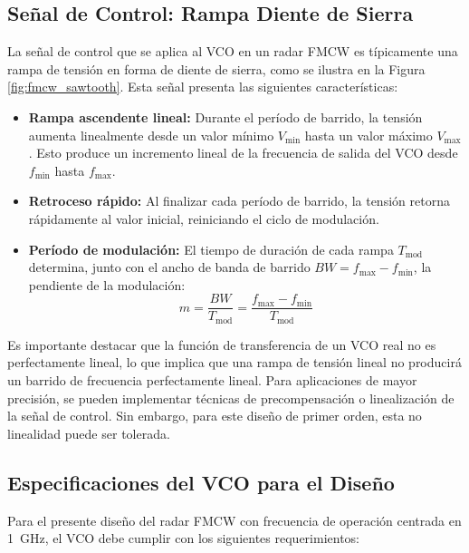 \subsection{Señal de Control: Rampa Diente de Sierra}

La señal de control que se aplica al VCO en un radar FMCW es típicamente una rampa de tensión en forma de diente de sierra, como se ilustra en la Figura \ref{fig:fmcw_sawtooth}. Esta señal presenta las siguientes características:

\begin{itemize}
    \item \textbf{Rampa ascendente lineal:} Durante el período de barrido, la tensión aumenta linealmente desde un valor mínimo $V_{\text{min}}$ hasta un valor máximo $V_{\text{max}}$. Esto produce un incremento lineal de la frecuencia de salida del VCO desde $f_{\text{min}}$ hasta $f_{\text{max}}$.
    
    \item \textbf{Retroceso rápido:} Al finalizar cada período de barrido, la tensión retorna rápidamente al valor inicial, reiniciando el ciclo de modulación.
    
    \item \textbf{Período de modulación:} El tiempo de duración de cada rampa $T_{\text{mod}}$ determina, junto con el ancho de banda de barrido $BW = f_{\text{max}} - f_{\text{min}}$, la pendiente de la modulación:
    \begin{equation}
    m = \frac{BW}{T_{\text{mod}}} = \frac{f_{\text{max}} - f_{\text{min}}}{T_{\text{mod}}}
    \end{equation}
\end{itemize}

Es importante destacar que la función de transferencia de un VCO real no es perfectamente lineal, lo que implica que una rampa de tensión lineal no producirá un barrido de frecuencia perfectamente lineal. Para aplicaciones de mayor precisión, se pueden implementar técnicas de precompensación o linealización de la señal de control. Sin embargo, para este diseño de primer orden, esta no linealidad puede ser tolerada.

\subsection{Especificaciones del VCO para el Diseño}

Para el presente diseño del radar FMCW con frecuencia de operación centrada en \qty{1}{\GHz}, el VCO debe cumplir con los siguientes requerimientos:

